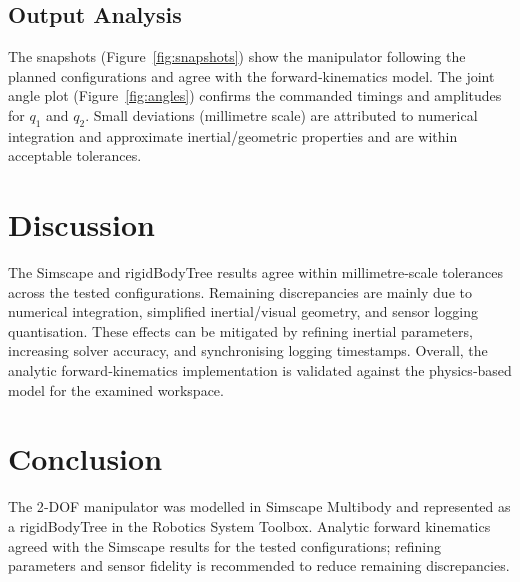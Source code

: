 \documentclass[12pt]{article}
\begin{document}
\subsection*{Output Analysis}
The snapshots (Figure~\ref{fig:snapshots}) show the manipulator following the planned configurations and agree with the forward‑kinematics model. The joint angle plot (Figure~\ref{fig:angles}) confirms the commanded timings and amplitudes for $q_1$ and $q_2$. Small deviations (millimetre scale) are attributed to numerical integration and approximate inertial/geometric properties and are within acceptable tolerances.

\section*{Discussion}
The Simscape and rigidBodyTree results agree within millimetre‑scale tolerances across the tested configurations. Remaining discrepancies are mainly due to numerical integration, simplified inertial/visual geometry, and sensor logging quantisation. These effects can be mitigated by refining inertial parameters, increasing solver accuracy, and synchronising logging timestamps. Overall, the analytic forward‑kinematics implementation is validated against the physics‑based model for the examined workspace.

\section*{Conclusion}

The 2‑DOF manipulator was modelled in Simscape Multibody and represented as a rigidBodyTree in the Robotics System Toolbox. Analytic forward kinematics agreed with the Simscape results for the tested configurations; refining parameters and sensor fidelity is recommended to reduce remaining discrepancies.



\renewcommand{\bibname}{References}

\end{document}
